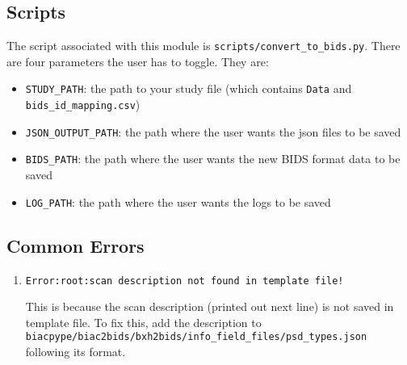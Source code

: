 \documentclass[12pt]{myland}
\def\<#1>{\texttt{#1}}
\begin{document}
    \begin{figure}[h]
        \begin{mybox}
        \end{mybox}
    \end{figure}

    \subsection{Scripts}
    The script associated with this module is \<scripts/convert\_to\_bids.py>. There are four 
    parameters the user has to toggle. They are:
    \begin{itemize}
        \item \<STUDY\_PATH>: the path to your study file (which contains \<Data> and \<bids\_id\_mapping.csv>)
        \item \<JSON\_OUTPUT\_PATH>: the path where the user wants the json files to be saved
        \item \<BIDS\_PATH>: the path where the user wants the new BIDS format data to be saved
        \item \<LOG\_PATH>: the path where the user wants the logs to be saved
    \end{itemize}

    \subsection{Common Errors}
    \begin{enumerate}
        \item \<Error:root:scan description not found in template file!> \par
            This is because the scan description (printed out next line) is not saved in template file. 
            To fix this, add the description to \<biacpype/biac2bids/bxh2bids/info\_field\_files/psd\_types.json> following
            its format.
    \end{enumerate}
\end{document}
